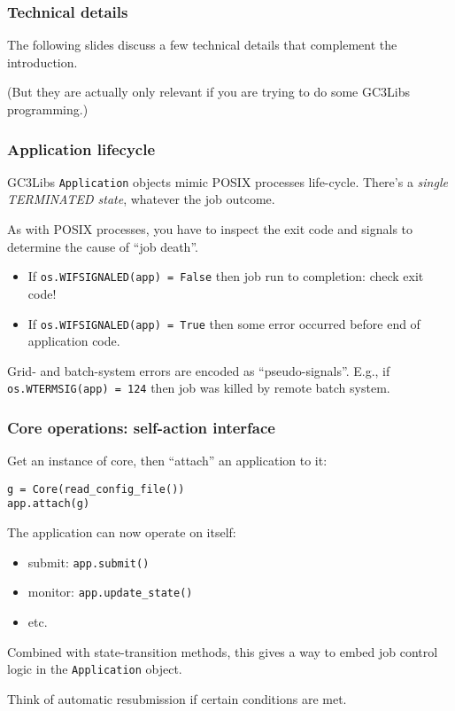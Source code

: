 \documentclass[presentation]{beamer}
\begin{document}
\begin{frame}
\frametitle{Technical details}
\label{sec-39}

  The following slides discuss a few technical details that complement
  the introduction.

  (But they are actually only relevant if you are trying to do some
  GC3Libs programming.)
\end{frame}
\begin{frame}
\frametitle{Application lifecycle}
\label{sec-40}

  GC3Libs \texttt{Application} objects mimic POSIX processes life-cycle.
  There's a \emph{single TERMINATED state}, whatever the job outcome.
  
  As with POSIX processes, you have to inspect the exit code and
  signals to determine the cause of ``job death''.
\begin{itemize}
\item If \texttt{os.WIFSIGNALED(app) = False} then job run to completion:
    check exit code!
\item If \texttt{os.WIFSIGNALED(app) = True} then some error occurred before
    end of application code.
\end{itemize}
  
  Grid- and batch-system errors are encoded as ``pseudo-signals''.
  E.g., if \texttt{os.WTERMSIG(app) = 124} then job was killed by remote
  batch system.
  
\end{frame}
\begin{frame}[fragile]
\frametitle{Core operations: self-action interface}
\label{sec-41}

  Get an instance of core, then ``attach'' an application to it:
\begin{verbatim}
g = Core(read_config_file())
app.attach(g)
\end{verbatim}

  The application can now operate on itself:
\begin{itemize}
\item submit: \texttt{app.submit()}
\item monitor: \texttt{app.update\_state()}
\item etc.
\end{itemize}

  Combined with state-transition methods, this gives a way to embed
  job control logic in the \texttt{Application} object.

  Think of automatic resubmission if certain conditions are met.
\end{frame}
\end{document}
